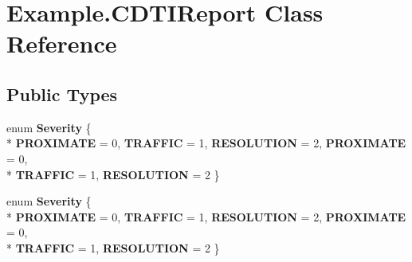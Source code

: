 \hypertarget{class_example_1_1_c_d_t_i_report}{}\section{Example.\+C\+D\+T\+I\+Report Class Reference}
\label{class_example_1_1_c_d_t_i_report}


 


\subsection*{Public Types}
\begin{DoxyCompactItemize}
\item 
\hypertarget{class_example_1_1_c_d_t_i_report_a2e9a6b1d49e40e4ef91e4f51f7cb56be}{}enum {\bfseries Severity} \{ \\*
{\bfseries P\+R\+O\+X\+I\+M\+A\+T\+E} = 0, 
{\bfseries T\+R\+A\+F\+F\+I\+C} = 1, 
{\bfseries R\+E\+S\+O\+L\+U\+T\+I\+O\+N} = 2, 
{\bfseries P\+R\+O\+X\+I\+M\+A\+T\+E} = 0, 
\\*
{\bfseries T\+R\+A\+F\+F\+I\+C} = 1, 
{\bfseries R\+E\+S\+O\+L\+U\+T\+I\+O\+N} = 2
 \}\label{class_example_1_1_c_d_t_i_report_a2e9a6b1d49e40e4ef91e4f51f7cb56be}

\item 
\hypertarget{class_example_1_1_c_d_t_i_report_a2e9a6b1d49e40e4ef91e4f51f7cb56be}{}enum {\bfseries Severity} \{ \\*
{\bfseries P\+R\+O\+X\+I\+M\+A\+T\+E} = 0, 
{\bfseries T\+R\+A\+F\+F\+I\+C} = 1, 
{\bfseries R\+E\+S\+O\+L\+U\+T\+I\+O\+N} = 2, 
{\bfseries P\+R\+O\+X\+I\+M\+A\+T\+E} = 0, 
\\*
{\bfseries T\+R\+A\+F\+F\+I\+C} = 1, 
{\bfseries R\+E\+S\+O\+L\+U\+T\+I\+O\+N} = 2
 \}\label{class_example_1_1_c_d_t_i_report_a2e9a6b1d49e40e4ef91e4f51f7cb56be}

\end{DoxyCompactItemize}
